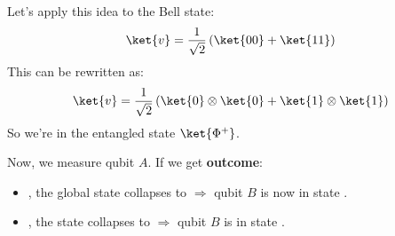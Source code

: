 \highspace
\begin{examplebox}
    Let's apply this idea to the Bell state:
    \begin{equation*}
        \ket{v} = \dfrac{1}{\sqrt{2}} \left(\ket{00} + \ket{11}\right)
    \end{equation*}
    This can be rewritten as:
    \begin{equation*}
        \ket{v} = \dfrac{1}{\sqrt{2}} \left(\ket{0} \otimes \ket{0} + \ket{1} \otimes \ket{1}\right)
    \end{equation*}
    So we're in the entangled state $\ket{\Phi^{+}}$.

    \highspace
    Now, we measure qubit $A$. If we get \textbf{outcome}:
    \begin{itemize}
        \item {}, the global state collapses to  $\Rightarrow$ qubit $B$ is now in state .
        \item {}, the state collapses to  $\Rightarrow$ qubit $B$ is in state .
    \end{itemize}
\end{examplebox}